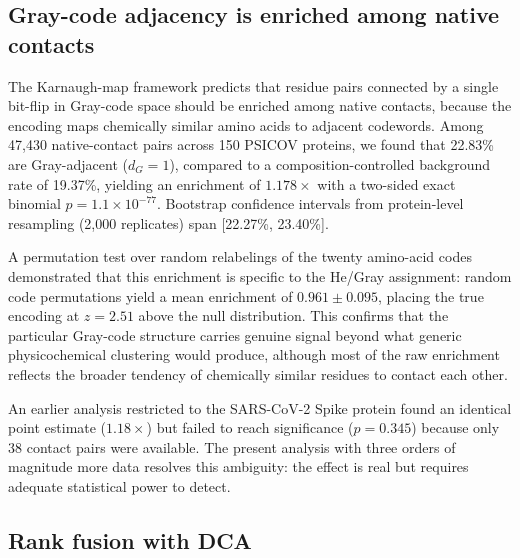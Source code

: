 \subsection{Gray-code adjacency is enriched among native contacts}
\label{sec:res-gray}

The Karnaugh-map framework predicts that residue pairs connected by a single
bit-flip in Gray-code space should be enriched among native contacts, because
the encoding maps chemically similar amino acids to adjacent codewords.
Among 47{,}430 native-contact pairs across 150 PSICOV proteins, we found
that 22.83\% are Gray-adjacent ($d_G = 1$), compared to a
composition-controlled background rate of 19.37\%, yielding an enrichment of
$1.178\times$ with a two-sided exact binomial $p = 1.1 \times 10^{-77}$.
Bootstrap confidence intervals from protein-level resampling (2{,}000
replicates) span [22.27\%, 23.40\%].

A permutation test over random relabelings of the twenty amino-acid codes
demonstrated that this enrichment is specific to the He/Gray assignment:
random code permutations yield a mean enrichment of $0.961 \pm 0.095$, placing
the true encoding at $z = 2.51$ above the null distribution.  This confirms
that the particular Gray-code structure carries genuine signal beyond what
generic physicochemical clustering would produce, although most of the raw
enrichment reflects the broader tendency of chemically similar residues to
contact each other.

An earlier analysis restricted to the SARS-CoV-2 Spike protein found an
identical point estimate ($1.18\times$) but failed to reach significance
($p = 0.345$) because only 38 contact pairs were available.  The present
analysis with three orders of magnitude more data resolves this ambiguity:
the effect is real but requires adequate statistical power to detect.

\subsection{Rank fusion with DCA}
\label{sec:res-fusion}

